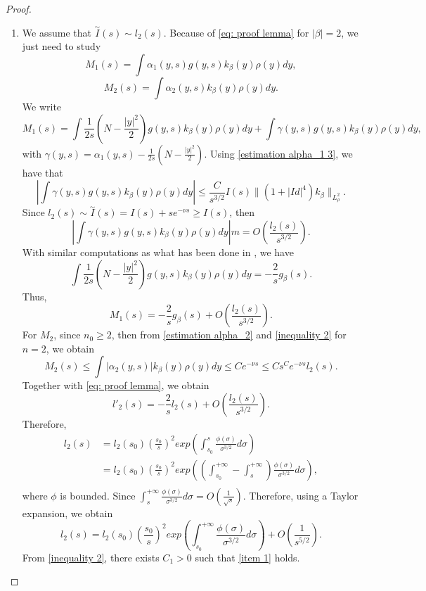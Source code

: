 \documentclass[11pt,a4paper]{article}
\newcommand{\1}{\mathbbm{1}}
\numberwithin{equation}{section}
\theoremstyle{remark}
\begin{document}
\begin{proof}
$ $
\begin{enumerate}[label=(\roman*)]
\item We assume that $\overset{\sim}{I}(s)\sim l_2(s)$. Because of \eqref{eq: proof lemma} for $|\beta|=2$, we just need to study
$$M_1(s)=\int \alpha_1(y,s)g(y,s)k_\beta(y)\rho(y)d y,$$
$$M_2(s)=\int \alpha_2(y,s)k_\beta(y)\rho(y)d y.$$
We write
\begin{equation*}
M_1(s)=\int \frac{1}{2s}\left(N-\frac{|y|^2}{2}\right)g(y,s)k_\beta(y)\rho(y)dy+\int \gamma(y,s) g(y,s)k_\beta(y)\rho(y)d y,
\end{equation*}
with $\gamma(y,s)=\alpha_1( y,s)- \frac{1}{2s}(N-\frac{|y|^2}{2}).$ Using \eqref{estimation alpha_1 3}, we have that
\begin{equation*}
\left|\int \gamma(y,s) g(y,s)k_\beta(y)\rho(y)d y\right| \leq \frac{C}{s^{3/2}}I(s)\|(1+|Id|^4)k_\beta\|_{L^2_\rho}.
\end{equation*}
Since $l_2(s)\sim \overset{\sim}{I}(s)=I(s)+se^{-\nu s}\geq I(s)$, then 
\begin{equation}\label{M1 part 2}
\left|\int \gamma(y,s) g(y,s)k_\beta(y)\rho(y)d y\right|m=O\left( \frac{l_2(s)}{s^{3/2}}\right).
\end{equation}
With similar computations  as what has been done in \cite[p.1200]{KZ2000}, we have
$$\int \frac{1}{2s}\left(N-\frac{|y|^2}{2}\right)g(y,s)k_\beta(y)\rho(y)dy= -\frac{2}{s}g_\beta(s).$$
Thus,
$$M_1(s)=-\frac{2}{s}g_\beta(s)+O\left(\frac{l_2(s)}{s^{3/2}}\right).$$
For $M_2$, since $n_0\geq 2$, then from \eqref{estimation alpha_2} and \eqref{inequality 2} for $n=2$, we obtain
\begin{equation}\label{M2}
M_2(s)\leq \int |\alpha_2(y,s)|k_\beta(y)\rho(y)d y\leq Ce^{-\nu s}\leq  Cs^C e^{-\nu s} l_2(s).
\end{equation}
Together with \eqref{eq: proof lemma}, we obtain 
$$l'_2(s)=-\frac{2}{s}l_2(s)+O\left(\frac{l_2(s)}{s^{3/2}}\right).$$
Therefore,
\begin{equation}
\begin{split}
l_2(s)&=l_2(s_0)\left(\frac{s_0}{s}\right)^2exp\left(\int^s_{s_0}\frac{\phi(\sigma)}{\sigma^{3/2}} d\sigma\right)\\
&=l_2(s_0)\left(\frac{s_0}{s}\right)^2exp\left(\left(\int^{+\infty}_{s_0}-\int^{+\infty}_{s}\right)\frac{\phi(\sigma)}{\sigma^{3/2}} d\sigma\right),\\
\end{split}
\end{equation}
where $\phi$ is bounded. Since $\int^{+\infty}_{s}\frac{\phi(\sigma)}{\sigma^{3/2}} d\sigma=O(\frac{1}{\sqrt{s}})$. Therefore, using a Taylor expansion, we obtain
$$l_2(s)=l_2(s_0)\left(\frac{s_0}{s}\right)^2exp\left(\int^{+\infty}_{s_0}\frac{\phi(\sigma)}{\sigma^{3/2}} d\sigma\right)+O\left(\frac{1}{s^{5/2}}\right).$$
From \eqref{inequality 2}, there exists $C_1>0$ such that \ref{item 1} holds.



\end{enumerate}
\end{proof}
\end{document}
